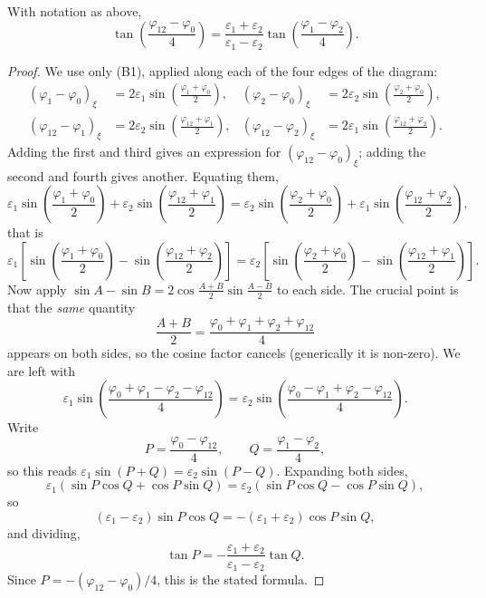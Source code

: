 \documentclass[a4paper]{scrartcl}
\begin{document}
\begin{theorem}
	With notation as above,
	$$
	\tan\left(\frac{\varphi_{12}-\varphi_0}{4}\right) = \frac{\varepsilon_1+\varepsilon_2}{\varepsilon_1-\varepsilon_2}\tan\left(\frac{\varphi_1-\varphi_2}{4}\right).
	$$
\end{theorem}
\begin{proof}
	We use only (B1), applied along each of the four edges of the diagram:
	\begin{align*}
		\left(\varphi_1-\varphi_0\right)_\xi &= 2\varepsilon_1\sin\left(\frac{\varphi_1+\varphi_0}{2}\right), &
		\left(\varphi_2-\varphi_0\right)_\xi &= 2\varepsilon_2\sin\left(\frac{\varphi_2+\varphi_0}{2}\right),\\
		\left(\varphi_{12}-\varphi_1\right)_\xi &= 2\varepsilon_2\sin\left(\frac{\varphi_{12}+\varphi_1}{2}\right), &
		\left(\varphi_{12}-\varphi_2\right)_\xi &= 2\varepsilon_1\sin\left(\frac{\varphi_{12}+\varphi_2}{2}\right).
	\end{align*}
	Adding the first and third gives an expression for $(\varphi_{12}-\varphi_0)_\xi$; adding the second and fourth gives another. Equating them,
	$$
	\varepsilon_1\sin\left(\frac{\varphi_1+\varphi_0}{2}\right) + \varepsilon_2\sin\left(\frac{\varphi_{12}+\varphi_1}{2}\right) = \varepsilon_2\sin\left(\frac{\varphi_2+\varphi_0}{2}\right) + \varepsilon_1\sin\left(\frac{\varphi_{12}+\varphi_2}{2}\right),
	$$
	that is
	$$
	\varepsilon_1\left[\sin\left(\frac{\varphi_1+\varphi_0}{2}\right) - \sin\left(\frac{\varphi_{12}+\varphi_2}{2}\right)\right] = \varepsilon_2\left[\sin\left(\frac{\varphi_2+\varphi_0}{2}\right) - \sin\left(\frac{\varphi_{12}+\varphi_1}{2}\right)\right].
	$$
	Now apply $\sin A - \sin B = 2\cos\frac{A+B}{2}\sin\frac{A-B}{2}$ to each side. The crucial point is that the \emph{same} quantity
	$$
	\frac{A+B}{2} = \frac{\varphi_0+\varphi_1+\varphi_2+\varphi_{12}}{4}
	$$
	appears on both sides, so the cosine factor cancels (generically it is non-zero). We are left with
	$$
	\varepsilon_1\sin\left(\frac{\varphi_0+\varphi_1-\varphi_2-\varphi_{12}}{4}\right) = \varepsilon_2\sin\left(\frac{\varphi_0-\varphi_1+\varphi_2-\varphi_{12}}{4}\right).
	$$
	Write
	$$
	P = \frac{\varphi_0-\varphi_{12}}{4}, \qquad Q = \frac{\varphi_1-\varphi_2}{4},
	$$
	so this reads $\varepsilon_1\sin(P+Q) = \varepsilon_2\sin(P-Q)$. Expanding both sides,
	$$
	\varepsilon_1\left(\sin P\cos Q + \cos P\sin Q\right) = \varepsilon_2\left(\sin P\cos Q - \cos P\sin Q\right),
	$$
	so
	$$
	\left(\varepsilon_1-\varepsilon_2\right)\sin P\cos Q = -\left(\varepsilon_1+\varepsilon_2\right)\cos P\sin Q,
	$$
	and dividing,
	$$
	\tan P = -\frac{\varepsilon_1+\varepsilon_2}{\varepsilon_1-\varepsilon_2}\tan Q.
	$$
	Since $P = -(\varphi_{12}-\varphi_0)/4$, this is the stated formula.
\end{proof}
\end{document}
